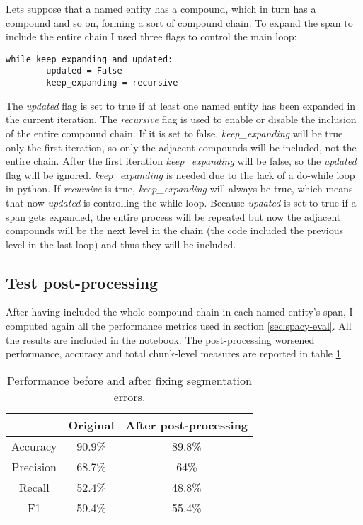 \documentclass[twocolumn, a4paper]{article}
\begin{document}
Lets suppose that a named entity has a compound, which in turn has a compound and so on, forming a sort of compound chain. To expand the span to include the entire chain I used three flags to control the main loop:
\begin{verbatim}
while keep_expanding and updated:
        updated = False
        keep_expanding = recursive
\end{verbatim}
The \textit{updated} flag is set to true if at least one named entity has been expanded in the current iteration. The \textit{recursive} flag is used to enable or disable the inclusion of the entire compound chain. If it is set to false, \textit{keep\_expanding} will be true only the first iteration, so only the adjacent compounds will be included, not the entire chain. After the first iteration \textit{keep\_expanding} will be false, so the \textit{updated} flag will be ignored. \textit{keep\_expanding} is needed due to the lack of a do-while loop in python. If \textit{recursive} is true, \textit{keep\_expanding} will always be true, which means that now \textit{updated} is controlling the while loop. Because \textit{updated} is set to true if a span gets expanded, the entire process will be repeated but now the adjacent compounds will be the next level in the chain (the code included the previous level in the last loop) and thus they will be included.

\subsection{Test post-processing}
After having included the whole compound chain in each named entity's span, I computed again all the performance metrics used in section \ref{sec:spacy-eval}. All the results are included in the notebook. The post-processing worsened performance, accuracy and total chunk-level measures are reported in table \ref{tab:post-eval}.

\begin{table}[h]
    \centering
    \begin{tabular}{|c|c|c|}
    \hline
    & \textbf{Original} & \textbf{After post-processing}\\
    \hline
    Accuracy    & 90.9\% & 89.8\%   \\
    \hline
    Precision   & 68.7\% & 64\%     \\
    \hline
    Recall      & 52.4\% & 48.8\%   \\
    \hline
    F1          & 59.4\% & 55.4\%   \\
    \hline
    \end{tabular}
    \caption{Performance before and after fixing segmentation errors.}
    \label{tab:post-eval}
\end{table}
\end{document}
